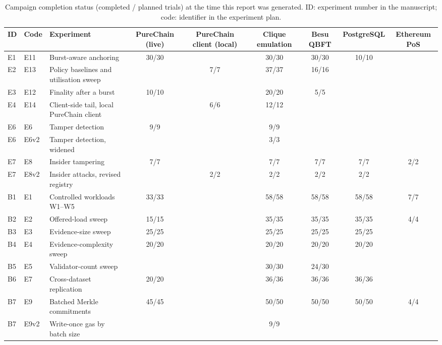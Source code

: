 \begin{table}[t]
\centering
\scriptsize
\caption{Campaign completion status (completed / planned trials) at the time this report was generated. ID: experiment number in the manuscript; code: identifier in the experiment plan.}
\label{tab:status}
\begin{adjustbox}{max width=\textwidth}
\begin{tabular}{lllcccccc}
\toprule
ID & Code & Experiment & PureChain (live) & PureChain client (local) & Clique emulation & Besu QBFT & PostgreSQL & Ethereum PoS \\
\midrule
E1 & E11 & Burst-aware anchoring & 30/30 &  & 30/30 & 30/30 & 10/10 &  \\
E2 & E13 & Policy baselines and utilisation sweep &  & 7/7 & 37/37 & 16/16 &  &  \\
E3 & E12 & Finality after a burst & 10/10 &  & 20/20 & 5/5 &  &  \\
E4 & E14 & Client-side tail, local PureChain client &  & 6/6 & 12/12 &  &  &  \\
E6 & E6 & Tamper detection & 9/9 &  & 9/9 &  &  &  \\
E6 & E6v2 & Tamper detection, widened &  &  & 3/3 &  &  &  \\
E7 & E8 & Insider tampering & 7/7 &  & 7/7 & 7/7 & 7/7 & 2/2 \\
E7 & E8v2 & Insider attacks, revised registry &  & 2/2 & 2/2 & 2/2 & 2/2 &  \\
B1 & E1 & Controlled workloads W1--W5 & 33/33 &  & 58/58 & 58/58 & 58/58 & 7/7 \\
B2 & E2 & Offered-load sweep & 15/15 &  & 35/35 & 35/35 & 35/35 & 4/4 \\
B3 & E3 & Evidence-size sweep & 25/25 &  & 25/25 & 25/25 & 25/25 &  \\
B4 & E4 & Evidence-complexity sweep & 20/20 &  & 20/20 & 20/20 & 20/20 &  \\
B5 & E5 & Validator-count sweep &  &  & 30/30 & 24/30 &  &  \\
B6 & E7 & Cross-dataset replication & 20/20 &  & 36/36 & 36/36 & 36/36 &  \\
B7 & E9 & Batched Merkle commitments & 45/45 &  & 50/50 & 50/50 & 50/50 & 4/4 \\
B7 & E9v2 & Write-once gas by batch size &  &  & 9/9 &  &  &  \\
\bottomrule
\end{tabular}\end{adjustbox}
\end{table}
